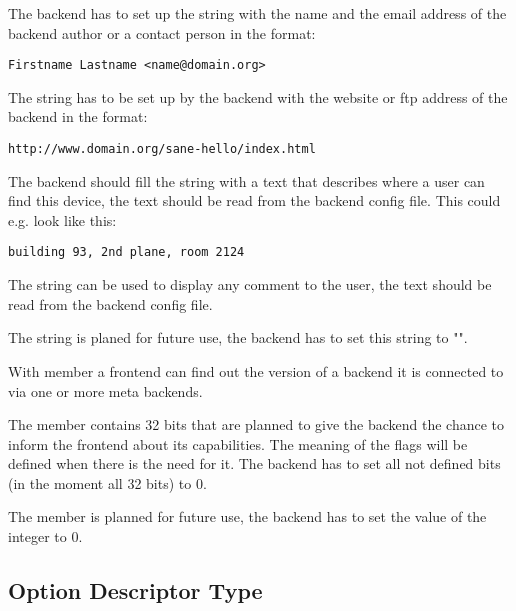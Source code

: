 \documentclass[11pt,DVIps]{report}
\begin{document}
\begin{changebar}
The backend has to set up the string 
with the name and the email address of the backend author or a contact person
in the format:
\begin{verbatim}
Firstname Lastname <name@domain.org>
\end{verbatim}

The string  has to be set up by the backend
with the website or ftp address of the backend in the format:
\begin{verbatim}
http://www.domain.org/sane-hello/index.html
\end{verbatim}

The backend should fill the string  with a
text that describes where a user can find this device, the text 
should be read from the backend config file. This could e.g. look
like this:
\begin{verbatim}
building 93, 2nd plane, room 2124
\end{verbatim}

The string  can be used to display any comment to the user,
the text should be read from the backend config file.

The string  is planed for future use, the backend
has to set this string to "".

With member  a frontend can find
out the version of a backend it is connected to via one or more meta
backends.

The member  contains 32 bits that
are planned to give the backend the chance to inform the frontend about
its capabilities. The meaning of the flags will be defined when there
is the need for it. The backend has to set all not defined bits
(in the moment all 32 bits) to 0.

The member  is planned for future use, the backend has
to set the value of the integer to 0.
\end{changebar}

\subsection{Option Descriptor Type}\label{sec:odesc}
\end{document}

